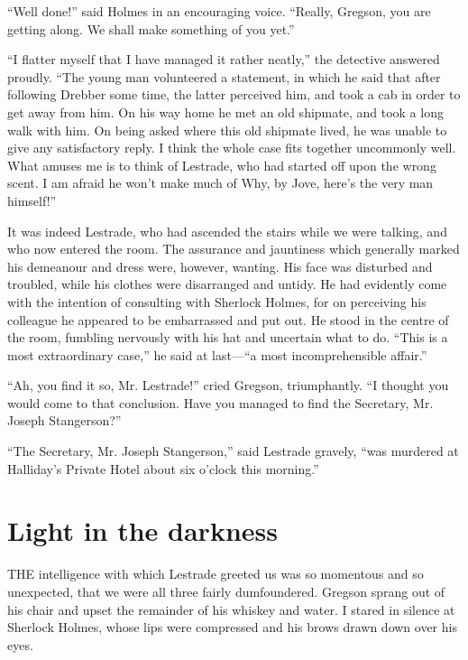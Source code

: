 \documentclass[12pt]{book}
\begin{document}
“Well done!” said Holmes in an encouraging voice. “Really, Gregson, you are getting along. We shall make something of you yet.” 

“I flatter myself that I have managed it rather neatly,” the detective answered proudly. “The young man volunteered a statement, in which he said that after following Drebber some time, the latter perceived him, and took a cab in order to get away from him. On his way home he met an old shipmate, and took a long walk with him. On being asked where this old shipmate lived, he was unable to give any satisfactory reply. I think the whole case fits together uncommonly well. What amuses me is to think of Lestrade, who had started off upon the wrong scent. I am afraid he won’t make much of Why, by Jove, here’s the very man himself!” 

It was indeed Lestrade, who had ascended the stairs while we were talking, and who now entered the room. The assurance and jauntiness which generally marked his demeanour and dress were, however, wanting. His face was disturbed and troubled, while his clothes were disarranged and untidy. He had evidently come with the intention of consulting with Sherlock Holmes, for on perceiving his colleague he appeared to be embarrassed and put out. He stood in the centre of the room, fumbling nervously with his hat and uncertain what to do. “This is a most extraordinary case,” he said at last—“a most incomprehensible affair.” 

“Ah, you find it so, Mr. Lestrade!” cried Gregson, triumphantly. “I thought you would come to that conclusion. Have you managed to find the Secretary, Mr. Joseph Stangerson?” 

“The Secretary, Mr. Joseph Stangerson,” said Lestrade gravely, “was murdered at Halliday’s Private Hotel about six o’clock this morning.” 







\chapter{Light in the darkness} 

THE intelligence with which Lestrade greeted us was so momentous and so unexpected, that we were all three fairly dumfoundered. Gregson sprang out of his chair and upset the remainder of his whiskey and water. I stared in silence at Sherlock Holmes, whose lips were compressed and his brows drawn down over his eyes. 
\end{document}
